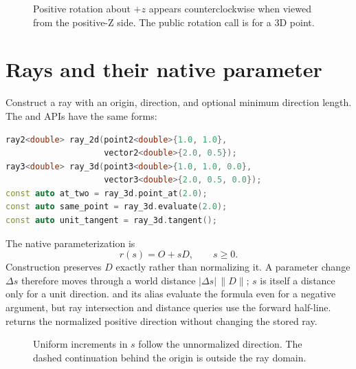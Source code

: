 \begin{figure}[htbp]
\centering
{}
\caption{Positive rotation about $+z$ appears counterclockwise when viewed
from the positive-Z side. The public rotation call is for a 3D point.}
\end{figure}

\section{Rays and their native parameter}

Construct a ray with an origin, direction, and optional minimum direction
length. The  and  APIs have the same forms:

\begin{lstlisting}[language=C++]
ray2<double> ray_2d(point2<double>{1.0, 1.0},
                    vector2<double>{2.0, 0.5});
ray3<double> ray_3d(point3<double>{1.0, 1.0, 0.0},
                    vector3<double>{2.0, 0.5, 0.0});
const auto at_two = ray_3d.point_at(2.0);
const auto same_point = ray_3d.evaluate(2.0);
const auto unit_tangent = ray_3d.tangent();
\end{lstlisting}

The native parameterization is
\[
 r(s)=O+sD,\qquad s\geq0.
\]
Construction preserves $D$ exactly rather than normalizing it. A parameter
change $\Delta s$ therefore moves through a world distance
$|\Delta s|\,\lVert D\rVert$; $s$ is itself a distance only for a unit
direction.  and its alias  evaluate the formula
even for a negative argument, but ray intersection and distance queries use
the forward half-line.  returns the normalized positive
direction without changing the stored ray.

\begin{figure}[htbp]
\centering
{}
\caption{Uniform increments in $s$ follow the unnormalized direction. The
dashed continuation behind the origin is outside the ray domain.}
\end{figure}

